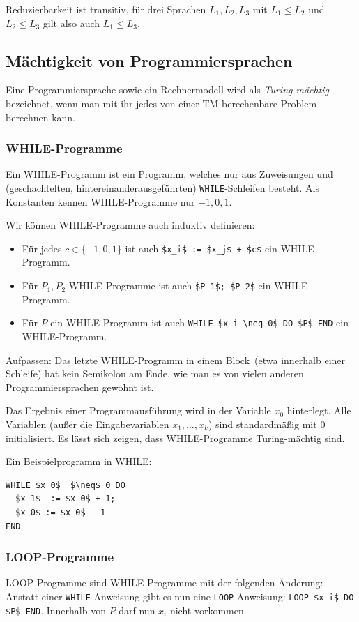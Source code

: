 \documentclass[a4paper,parskip=half*,DIV=7,fontsize=11pt]{scrartcl}
\begin{document}
Reduzierbarkeit ist transitiv, für drei Sprachen $L_1,L_2,L_3$ mit $L_1\leq L_2$ und $L_2 \leq L_3$ gilt also auch $L_1\leq L_3$.

\subsection{Mächtigkeit von Programmiersprachen}
Eine Programmiersprache sowie ein Rechnermodell wird als \emph{Turing-mächtig} bezeichnet, wenn man mit ihr jedes von einer TM berechenbare Problem berechnen kann.

\subsubsection{WHILE-Programme}
Ein  WHILE-Programm  ist ein Programm, welches nur aus Zuweisungen und  (geschachtelten, hintereinanderausgeführten) \lstinline{WHILE}-Schleifen besteht. Als Konstanten kennen WHILE-Programme nur $-1, 0, 1$. 

Wir können WHILE-Programme auch induktiv definieren:
\begin{itemize}
\item Für jedes $c \in \{-1, 0, 1\}$ ist auch \lstinline{$x_i$ := $x_j$ + $c$} ein WHILE-Programm.
\item Für $P_1, P_2$ WHILE-Programme ist auch \lstinline{$P_1$; $P_2$} ein WHILE-Programm.
\item Für $P$ ein WHILE-Programm ist auch \lstinline{WHILE $x_i \neq 0$ DO $P$ END} ein WHILE-Programm.
\end{itemize}

Aufpassen: Das letzte WHILE-Programm in einem \glqq Block\grqq\ (etwa innerhalb einer Schleife) hat kein Semikolon am Ende, wie man es von vielen anderen Programmiersprachen gewohnt ist.

Das Ergebnis einer Programmausführung wird in der Variable $x_0$ hinterlegt. Alle Variablen (außer die Eingabevariablen $x_1,\ldots,x_k$) sind standardmäßig mit $0$ initialisiert. Es lässt sich zeigen, dass  WHILE-Programme Turing-mächtig sind.

Ein Beispielprogramm in WHILE:

\begin{lstlisting}
WHILE $x_0$  $\neq$ 0 DO
  $x_1$  := $x_0$ + 1;
  $x_0$ := $x_0$ - 1
END
\end{lstlisting}

\subsubsection{LOOP-Programme}
LOOP-Programme sind WHILE-Programme mit der folgenden Änderung: Anstatt einer \lstinline{WHILE}-Anweisung gibt es nun eine \lstinline{LOOP}-Anweisung: \lstinline{LOOP $x_i$ DO $P$ END}. Innerhalb von $P$ darf nun $x_i$ nicht vorkommen.
\end{document}
